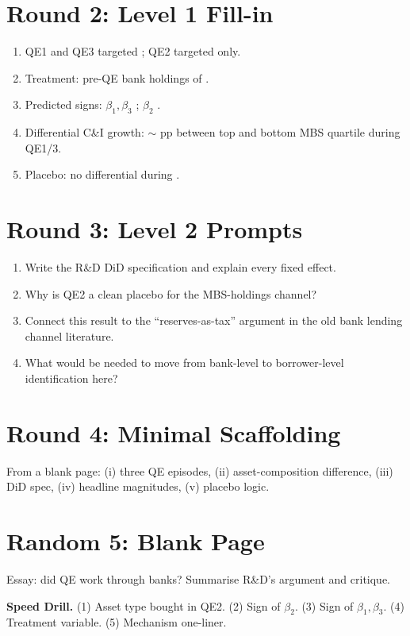 \documentclass[11pt]{article}
\newcommand{\blank}[1]{\underline{\hspace{#1}}}
\begin{document}
\section*{Round 2: Level 1 Fill-in}
\begin{enumerate}
\item QE1 and QE3 targeted \blank{1cm}; QE2 targeted \blank{1cm} only.
\item Treatment: pre-QE bank holdings of \blank{1cm}.
\item Predicted signs: $\beta_1,\beta_3$ \blank{0.6cm}; $\beta_2$ \blank{0.6cm}.
\item Differential C\&I growth: $\sim$\blank{1cm} pp between top and bottom MBS quartile during QE1/3.
\item Placebo: no differential during \blank{1cm}.
\end{enumerate}

\section*{Round 3: Level 2 Prompts}
\begin{enumerate}
\item Write the R\&D DiD specification and explain every fixed effect.
\item Why is QE2 a clean placebo for the MBS-holdings channel?
\item Connect this result to the ``reserves-as-tax'' argument in the old bank lending channel literature.
\item What would be needed to move from bank-level to borrower-level identification here?
\end{enumerate}

\section*{Round 4: Minimal Scaffolding}
From a blank page: (i) three QE episodes, (ii) asset-composition difference, (iii) DiD spec, (iv) headline magnitudes, (v) placebo logic.

\section*{Random 5: Blank Page}
Essay: did QE work through banks? Summarise R\&D's argument and critique.

\vspace{6pt}
\begin{drillbox}
\textbf{Speed Drill.} (1) Asset type bought in QE2. (2) Sign of $\beta_2$. (3) Sign of $\beta_1,\beta_3$. (4) Treatment variable. (5) Mechanism one-liner.
\end{drillbox}
\end{document}
